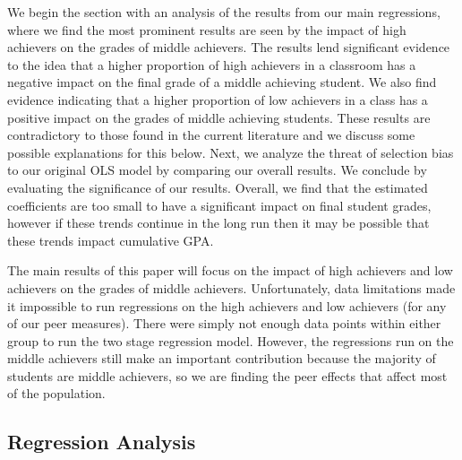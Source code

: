 We begin the section with an analysis of the results from our main regressions, where we find the most prominent results are seen by the impact of high achievers on the grades of middle achievers. 
The results lend significant evidence to the idea that a higher proportion of high achievers in a classroom has a negative impact on the final grade of a middle achieving student. 
We also find evidence indicating that a higher proportion of low achievers in a class has a positive impact on the grades of middle achieving students. 
These results are contradictory to those found in the current literature \citep{kang2007classroom,carman2012classroom,burke2013classroom,schlosser2008inside,lavy2012good} and we discuss some possible explanations for this below. 
Next, we analyze the threat of selection bias to our original OLS model by comparing our overall results. 
We conclude by evaluating the significance of our results. 
Overall, we find that the estimated coefficients are too small to have a significant impact on final student grades, however if these trends continue in the long run then it may be possible that these trends impact cumulative GPA. 

The main results of this paper will focus on the impact of high achievers and low achievers on the grades of middle achievers. 
Unfortunately, data limitations made it impossible to run regressions on the high achievers and low achievers (for any of our peer measures). 
There were simply not enough data points within either group to run the two stage regression model. 
However, the regressions run on the middle achievers still make an important contribution because the majority of students are middle achievers, so we are finding the peer effects that affect most of the population.

\subsection{Regression Analysis}\label{results:reganalysis}

